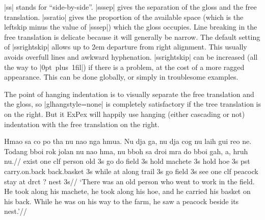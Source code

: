 |ss| stands for ``side-by-side''.
|sssep| gives the separation of the gloss and the free
translation. |ssratio| gives the proportion of the available
space (which is the leftskip minus the value of |sssep|) which
the gloss occupies.  Line breaking in the free translation is
delicate because it will generally be narrow. The default setting
of |ssrightskip| allows  up to 2em departure from right
alignment. This usually avoids overfull lines and awkward
hyphenation.  |ssrightskip| can be increased (all the way to
\hbox{|0pt plus 1fil|}) if there is a problem, at the cost of a
more ragged appearance.  This can be done globally, or simply in
troublesome examples.

The point of hanging indentation is to visually separate the free
translation and the gloss, so |glhangstyle=none| is completely
satisfactory if the tree translation is on the right. But {it
ExPex\/} will happily use hanging (either cascading or not)
indentation with the free translation on the right.


\framedisplay
\ex[glftpos=right,glhangstyle=none,ssratio=.7,sssep=1.5em,
ssrightskip=0pt plus .4em]
\begingl
\gla
Hmao sa co po tha  nu nao nga hmua. Nu dja ga, nu dja cog nu laih
gui reo ne. Todang bboi rok jolan nu nao hma, nu bboh sa droi mra
do bboi gah, a, hruh nu.//
\glb
exist one {clf} person old 3s go do field 3s hold machete 3s hold
hoe 3s pst carry.on.back back.basket 3s while at {along} trail 3s
go field 3s see one clf peacock stay at drct {?} nest 3s//
\glft
`There was an old person who went to work in the field. He took
along his machete, he took along his hoe, and he carried his
basket on his back. While he was on his way to the farm, he saw a
peacock beside its nest.'//
\endgl
\xe
\endframedisplay

\endinput

\lingset{glhangstyle=none}

\exdisplay\noexno
\begingl[glftpos=below]
[A]\quad \gla
Hmao sa co po tha  nu nao nga hmua. Nu dja ga, nu dja cog nu laih
gui reo ne. Todang bboi rok jolan nu nao hma, nu bboh sa droi mra
do bboi gah, a, hruh nu.//
\glb
exist one {clf} person old 3s go do field 3s hold machete 3s hold
hoe 3s pst carry.on.back back.basket 3s while at {along} trail 3s
go field 3s see one clf peacock stay at drct {?} nest 3s//
\glft
`There was an old person who went to work in the field. He took
along his machete, he took along his hoe, and he carried his
basket on his back. While he was on his way to the farm, he saw a
peacock beside its nest.'//
\endgl
\xe


